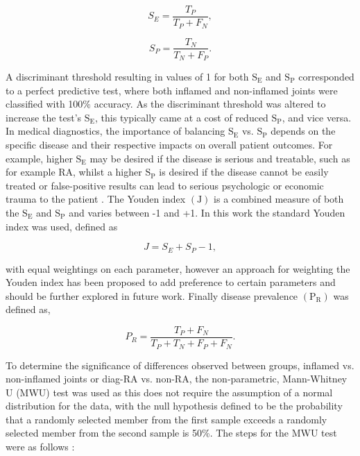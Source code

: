 \documentclass[twoside]{bhamthesis}
\theoremstyle{definition}
\begin{document}
\begin{figure}[!ht]
	\begin{minipage}{.5\textwidth}
   \begin{equation}
S_E = \frac{T_P}{T_P + F_N} ,
  	\label{eqn:sens}
    \end{equation} 
  \end{minipage}%
  \begin{minipage}{.5\textwidth}
    \begin{equation}
S_P = \frac{T_N}{T_N + F_P}.
  	\label{eqn:spe}
    \end{equation}
  \end{minipage}
\end{figure}

A discriminant threshold resulting in values of 1 for both $\mathrm{S_E}$ and $\mathrm{S_P}$ corresponded to a perfect predictive test, where both inflamed and non-inflamed joints were classified with 100\% accuracy. As the discriminant threshold was altered to increase the test's $\mathrm{S_E}$, this typically came at a cost of reduced $\mathrm{S_P}$, and vice versa. In medical diagnostics, the importance of balancing $\mathrm{S_E}$ vs. $\mathrm{S_P}$ depends on the specific disease and their respective impacts on overall patient outcomes. For example, higher $\mathrm{S_E}$ may be desired if the disease is serious and treatable, such as for example RA, whilst a higher $\mathrm{S_P}$ is desired if the disease cannot be easily treated or false-positive results can lead to serious psychologic or economic trauma to the patient \cite{galan1975beyond}. The Youden index $\mathrm{(J)}$ is a combined measure of both the $\mathrm{S_E}$ and $\mathrm{S_P}$ \cite{youden1950index} and varies between -1 and +1. In this work the standard Youden index was used, defined as

\begin{equation}
J = S_E + S_P - 1,
  \label{eqn:Jouden}
\end{equation}

with equal weightings on each parameter, however an approach for weighting the Youden index has been proposed \cite{galan1975beyond} to add preference to certain parameters and should be further explored in future work. Finally disease prevalence $\mathrm{(P_R)}$ was defined as,

\begin{equation}
P_R = \frac{T_P + F_N}{T_P + T_N + F_P + F_N}.
  \label{eqn:RTE}
\end{equation}

To determine the significance of differences observed between groups, inflamed vs. non-inflamed joints or diag-RA vs. non-RA, the non-parametric, Mann-Whitney U (MWU) test was used as this does not require the assumption of a normal distribution for the data, with the null hypothesis defined to be the probability that a randomly selected member from the first sample exceeds a randomly selected member from the second sample is 50\%. The steps for the MWU test were as follows  \cite{altman1990practical}:
\end{document}
